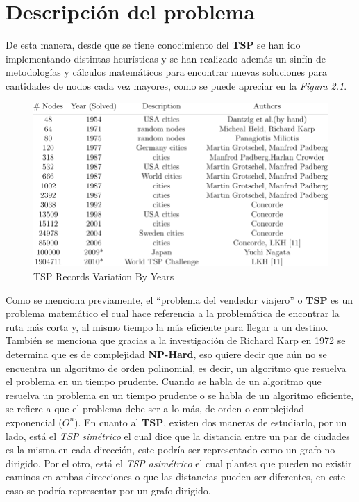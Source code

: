         \section{Descripción del problema}
            De esta manera, desde que se tiene conocimiento del \textbf{TSP} se han ido implementando distintas heurísticas y se han realizado además un sinfín de metodologías y cálculos matemáticos para encontrar nuevas soluciones para cantidades de nodos cada vez mayores, como se puede apreciar en la \textit{Figura 2.1}.
            \begin{figure}[ht]
                \centering
                \includegraphics{imgs/TSP-Records-Variation-By-Years-3.png}
                \caption{TSP Records Variation By Years\parencite{np}}
                \label{Ilustracion 1}
            \end{figure}
            \newline
            Como se menciona previamente, el ``problema del vendedor viajero'' o \textbf{TSP} es un problema matemático el cual hace referencia a la problemática de encontrar la ruta más corta y, al mismo tiempo la más eficiente para llegar a un destino.  
            \newline
            \newline
            También se menciona que gracias a la investigación de Richard Karp en 1972 se determina que es de complejidad \textbf{NP-Hard}, eso quiere decir que aún no se encuentra un algoritmo de orden polinomial, es decir, un algoritmo que resuelva el problema en un tiempo prudente.  
            \newline
            \newline
            Cuando se habla de un algoritmo que resuelva un problema en un tiempo prudente o se habla de un algoritmo eficiente, se refiere a que el problema debe ser a lo más, de orden o complejidad exponencial (\(O^n\)). 
            \newline
            \newline
            En cuanto al \textbf{TSP}, existen dos maneras de estudiarlo, por un lado, está el \textit{TSP simétrico} el cual dice que la distancia entre un par de ciudades es la misma en cada dirección, este podría ser representado como un grafo no dirigido. Por el otro, está el \textit{TSP asimétrico} el cual plantea que pueden no existir caminos en ambas direcciones o que las distancias pueden ser diferentes, en este caso se podría representar por un grafo dirigido. 
        
